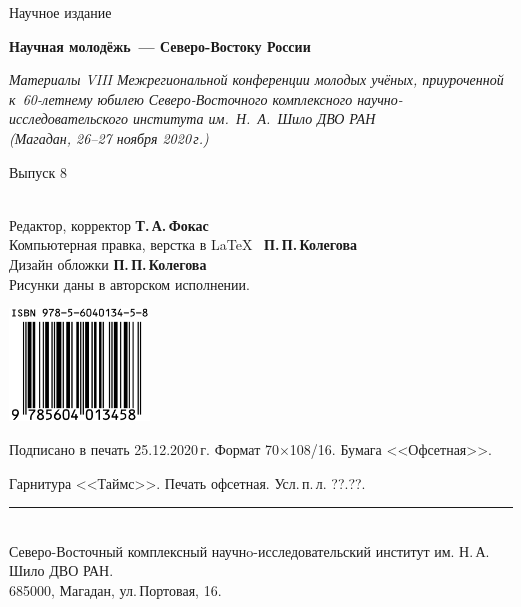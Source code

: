 \thispagestyle{empty}
\hspace{2cm}
\vfill
\begin{center}
  {Научное издание}

  \medskip
  \bigskip
  \textbf{\large Научная молодёжь~--- Северо-Востоку России}

  \medskip
  \textit{Материалы VIII Межрегиональной конференции молодых учёных, приуроченной к~60-летнему юбилею
  Северо-Восточного комплексного научно-исследовательского института им.~Н.~А.~Шило ДВО РАН\\ (Магадан,
  26--27 ноября 2020\,г.)}

  \vfill
  Выпуск 8
\end{center}
\vfill

\hspace{2cm}\\ \small
Редактор, корректор \textbf{Т.\,А.\,Фокас}\\
Компьютерная правка, верстка в \LaTeX~ \textbf{П.\,П.\,Колегова}\\
Дизайн обложки \textbf{П.\,П.\,Колегова}\\
Рисунки даны в авторском исполнении.

\vfill

\begin{center}
\includegraphics[height=30mm]{ISBN-978-5-6040134-5-8.jpg}
\end{center}


\enlargethispage{5\baselineskip}
\begin{changemargin}{-2cm}{-2cm}
\begin{center}
  \footnotesize
  Подписано в печать 25.12.2020\,г.  Формат 70$\times$108/16. Бумага
  <<Офсетная>>.\hspace*{2em}

  Гарнитура <<Таймс>>. Печать офсетная.  Усл.\,п.\,л. ??.??.
  \rule{1.1\textwidth}{.1mm}\\
  Северо-Восточный комплексный научнo-исследовательский институт им.
  Н.\,А.\,Шило ДВО РАН. \\ 685000, Магадан, ул.\,Портовая, 16.
\end{center}
\end{changemargin}
